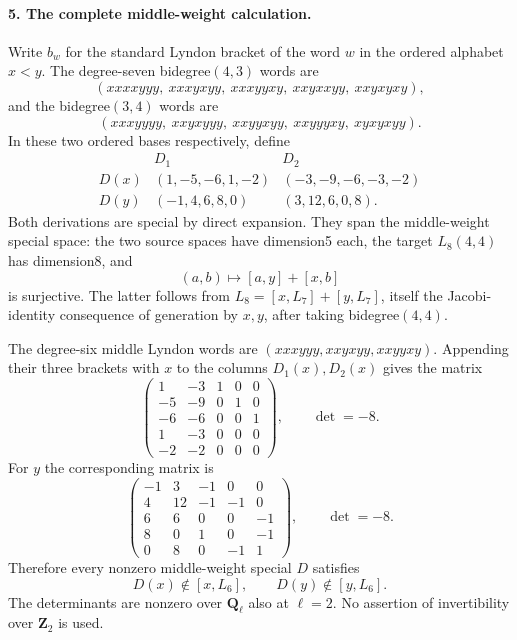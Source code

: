 \paragraph{5. The complete middle-weight calculation.}
Write $b_w$ for the standard Lyndon bracket of the word $w$ in the
ordered alphabet $x<y$. The degree-seven bidegree$(4,3)$ words are
\[
 (xxxxyyy,\ xxxyxyy,\ xxxyyxy,\ xxyxxyy,\ xxyxyxy),
\]
and the bidegree$(3,4)$ words are
\[
 (xxxyyyy,\ xxyxyyy,\ xxyyxyy,\ xxyyyxy,\ xyxyxyy).
\]
In these two ordered bases respectively, define
\[
\begin{array}{c|rr}
 &D_1&D_2\\\hline
 D(x)&(1,-5,-6,1,-2)&(-3,-9,-6,-3,-2)\\
 D(y)&(-1,4,6,8,0)&(3,12,6,0,8).
\end{array}
\]
Both derivations are special by direct expansion. They span the
middle-weight special space: the two source spaces have dimension5
each, the target $L_8(4,4)$ has dimension8, and
\[
 (a,b)\longmapsto[a,y]+[x,b]
\]
is surjective. The latter follows from
$L_8=[x,L_7]+[y,L_7]$, itself the Jacobi-identity consequence of
generation by $x,y$, after taking bidegree$(4,4)$.

The degree-six middle Lyndon words are
$(xxxyyy,xxyxyy,xxyyxy)$. Appending their three brackets with $x$
to the columns $D_1(x),D_2(x)$ gives the matrix
\[
 \begin{pmatrix}
 1&-3&1&0&0\\-5&-9&0&1&0\\-6&-6&0&0&1\\
 1&-3&0&0&0\\-2&-2&0&0&0
 \end{pmatrix},\qquad\det=-8.
\]
For $y$ the corresponding matrix is
\[
 \begin{pmatrix}
 -1&3&-1&0&0\\4&12&-1&-1&0\\6&6&0&0&-1\\
 8&0&1&0&-1\\0&8&0&-1&1
 \end{pmatrix},\qquad\det=-8.
\]
Therefore every nonzero middle-weight special $D$ satisfies
\[
 D(x)\notin[x,L_6],\qquad D(y)\notin[y,L_6].
\]
The determinants are nonzero over $\mathbf Q_\ell$ also at
$\ell=2$. No assertion of invertibility over $\mathbf Z_2$ is used.

